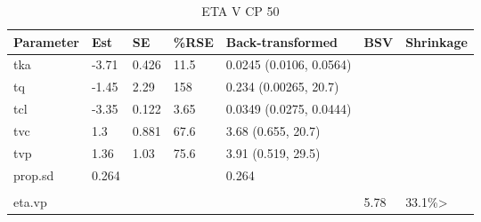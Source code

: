 \begin{table}
\centering\centering
\caption{ETA V CP 50}
\centering
\fontsize{8}{10}\selectfont
\begin{tabular}[t]{lllllll}
\toprule
\textbf{Parameter} & \textbf{Est} & \textbf{SE} & \textbf{\%RSE} & \textbf{Back-transformed} & \textbf{BSV} & \textbf{Shrinkage}\\
\midrule
tka & -3.71 & 0.426 & 11.5 & 0.0245 (0.0106, 0.0564) &  & \\
\midrule
tq & -1.45 & 2.29 & 158 & 0.234 (0.00265, 20.7) &  & \\
\midrule
tcl & -3.35 & 0.122 & 3.65 & 0.0349 (0.0275, 0.0444) &  & \\
\midrule
tvc & 1.3 & 0.881 & 67.6 & 3.68 (0.655, 20.7) &  & \\
\midrule
tvp & 1.36 & 1.03 & 75.6 & 3.91 (0.519, 29.5) &  & \\
\midrule
prop.sd & 0.264 &  &  & 0.264 &  & \\
\midrule\\
eta.vp &  &  &  &  & 5.78 & 33.1\%>\\
\bottomrule
\end{tabular}
\end{table}